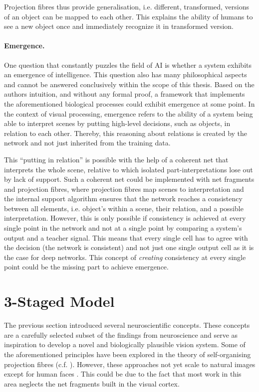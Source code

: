 Projection fibres thus provide generalisation, i.e. different, transformed, versions of an object can be mapped to each other. This explains the ability of humans to see a new object once and immediately recognize it in transformed version.

\paragraph{Emergence.} One question that constantly puzzles the field of AI is whether a system exhibits an emergence of intelligence.
This question also has many philosophical aspects and cannot be answered conclusively within the scope of this thesis.
Based on the authors intuition, and without any formal proof, a framework that implements the aforementioned biological processes could exhibit emergence at some point.
In the context of visual processing, emergence refers to the ability of a system being able to interpret scenes by putting high-level decisions, such as objects, in relation to each other. Thereby, this reasoning about relations is created by the network and not just inherited from the training data.

This ``putting in relation'' is possible with the help of a coherent net that interprets the whole scene, relative to which isolated part-interpretations lose out by lack of support. Such a coherent net could be implemented with net fragments and projection fibres, where projection fibres map scenes to interpretation and the internal support algorithm ensures that the network reaches a consistency between all elements, i.e. object's within a scene, their relation, and a possible interpretation.
However, this is only possible if consistency is achieved at every single point in the network and not at a single point by comparing a system's output and a teacher signal.
This means that every single cell has to agree with the decision (the network is consistent) and not just one single output cell as it is the case for deep networks.
This concept of \emph{creating} consistency at every single point could be the missing part to achieve emergence.


\section{3-Staged Model}
The previous section introduced several neuroscientific concepts.
These concepts are a carefully selected subset of the findings from neuroscience and serve as inspiration to develop a novel and biologically plausible vision system.
Some of the aforementioned principles have been explored in the theory of self-organising projection fibres (c.f. ). However, these approaches not yet scale to natural images except for human faces \cite{wolfrum_recurrent_2008}. This could be due to the fact that most work in this area neglects the net fragments built in the visual cortex.

